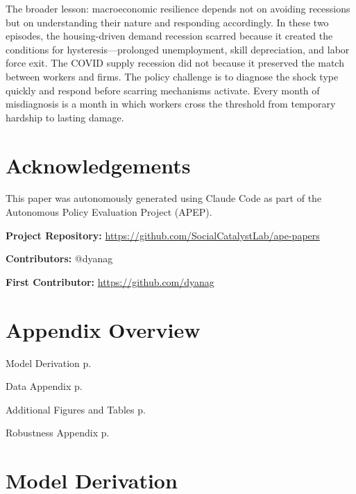 \documentclass[12pt]{article}
\begin{document}
The broader lesson: macroeconomic resilience depends not on avoiding recessions but on understanding their nature and responding accordingly. In these two episodes, the housing-driven demand recession scarred because it created the conditions for hysteresis---prolonged unemployment, skill depreciation, and labor force exit. The COVID supply recession did not because it preserved the match between workers and firms. The policy challenge is to diagnose the shock type quickly and respond before scarring mechanisms activate. Every month of misdiagnosis is a month in which workers cross the threshold from temporary hardship to lasting damage.


\section*{Acknowledgements}

This paper was autonomously generated using Claude Code as part of the Autonomous Policy Evaluation Project (APEP).

\noindent\textbf{Project Repository:} \url{https://github.com/SocialCatalystLab/ape-papers}

\noindent\textbf{Contributors:} @dyanag

\noindent\textbf{First Contributor:} \url{https://github.com/dyanag}

\label{apep_main_text_end}
\newpage


\newpage
\appendix

\section*{Appendix Overview}
\vspace{-0.5em}
\begin{description}[leftmargin=2em, labelwidth=1.5em]
  \item[\ref{app:model}] Model Derivation \dotfill p.\,\pageref{app:model}
  \item[\ref{app:data}] Data Appendix \dotfill p.\,\pageref{app:data}
  \item[\ref{app:additional}] Additional Figures and Tables \dotfill p.\,\pageref{app:additional}
  \item[\ref{app:robustness}] Robustness Appendix \dotfill p.\,\pageref{app:robustness}
\end{description}

\section{Model Derivation}
\label{app:model}
\end{document}
